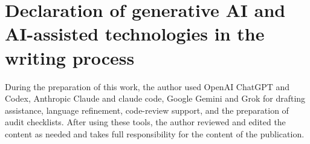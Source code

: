 \documentclass[preprint,12pt]{elsarticle}
\begin{document}








\section*{Declaration of generative AI and AI-assisted technologies in the
writing process}
\begin{sloppypar}
During the preparation of this work, the author used OpenAI ChatGPT and Codex, Anthropic Claude and claude code, Google Gemini and Grok for drafting assistance, language refinement, code-review support, and the preparation of audit checklists. After using these tools, the author reviewed and edited the content as needed and takes full responsibility for the content of the publication.
\end{sloppypar}




\end{document}
